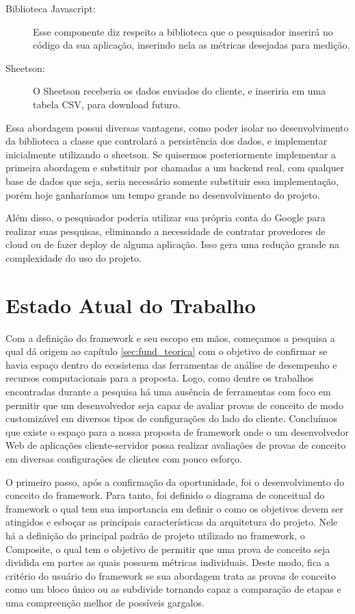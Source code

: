 \documentclass[12pt]{tcc}
\begin{document}
\begin{description}
	\item[Biblioteca Javascript:] Esse componente diz respeito a biblioteca que o pesquisador inserirá no código da sua aplicação, inserindo nela as métricas desejadas para medição.
	
	\item[Sheetson:] O Sheetson receberia os dados enviados do cliente, e inseriria em uma tabela CSV, para download futuro.

\end{description}

Essa abordagem possui diversas vantagens, como poder isolar no desenvolvimento da biblioteca a classe que controlará a persistência dos dados, e implementar inicialmente utilizando o sheetson. Se quisermos posteriormente implementar a primeira abordagem e substituir por chamadas a um backend real, com qualquer base de dados que seja, seria necessário somente substituir essa implementação, porém hoje ganharíamos um tempo grande no desenvolvimento do projeto.

Além disso, o pesquisador poderia utilizar sua própria conta do Google para realizar suas pesquisas, eliminando a necessidade de contratar provedores de cloud ou de fazer deploy de alguma aplicação. Isso gera uma redução grande na complexidade do uso do projeto.


\chapter{Estado Atual do Trabalho}
\label{sec:curr_state}

Com a definição do framework e seu escopo em mãos, começamos a pesquisa a qual dá origem ao capítulo \ref{sec:fund_teorica} com o objetivo de confirmar se havia espaço dentro do ecosistema das ferramentas de análise de desempenho e recursos computacionais para a proposta.
Logo, como dentre os trabalhos encontradas durante a pesquisa há uma ausência de ferramentas com foco em permitir que um desenvolvedor seja capaz de avaliar provas de conceito de modo customizável em diversos tipos de configurações do lado do cliente.
Concluímos que existe o espaço para a nossa proposta de framework onde o um desenvolvedor Web de aplicações cliente-servidor possa realizar avaliações de provas de conceito em diversas configurações de clientes com pouco esforço.

O primeiro passo, após a confirmação da oportunidade, foi o desenvolvimento do conceito do framework.
Para tanto, foi definido o diagrama de conceitual do framework o qual tem sua importancia em definir o como os objetivos devem ser atingidos e esboçar as principais características da arquitetura do projeto.
Nele há a definição do principal padrão de projeto utilizado no framework, o Composite, o qual tem o objetivo de permitir que uma prova de conceito seja dividida em partes as quais possuem métricas individuais.
Deste modo, fica a critério do usuário do framework se sua abordagem trata as provas de conceito como um bloco único ou as subdivide tornando capaz a comparação de etapas e uma compreenção melhor de possíveis gargalos.
\end{document}
